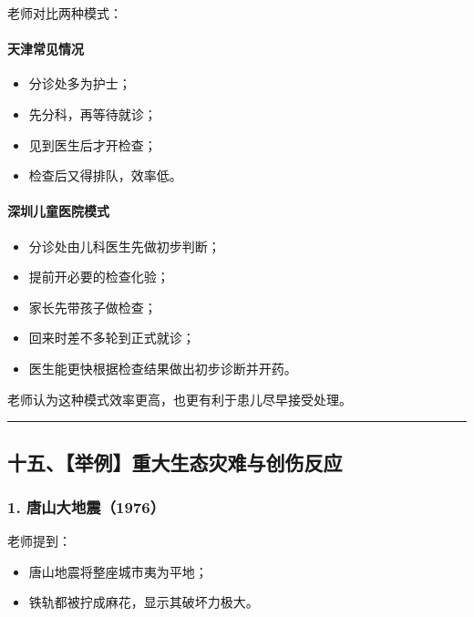 \documentclass[
  chinese,
  9pt,
  a4paper,
]{ctexart}
\providecommand{\tightlist}{%
  \setlength{\itemsep}{0pt}\setlength{\parskip}{0pt}}
\begin{document}
老师对比两种模式：

\paragraph{天津常见情况}\label{ux5929ux6d25ux5e38ux89c1ux60c5ux51b5}

\begin{itemize}
\tightlist
\item
  分诊处多为护士；
\item
  先分科，再等待就诊；
\item
  见到医生后才开检查；
\item
  检查后又得排队，效率低。
\end{itemize}

\paragraph{深圳儿童医院模式}\label{ux6df1ux5733ux513fux7ae5ux533bux9662ux6a21ux5f0f}

\begin{itemize}
\tightlist
\item
  分诊处由儿科医生先做初步判断；
\item
  提前开必要的检查化验；
\item
  家长先带孩子做检查；
\item
  回来时差不多轮到正式就诊；
\item
  医生能更快根据检查结果做出初步诊断并开药。
\end{itemize}

老师认为这种模式效率更高，也更有利于患儿尽早接受处理。

\begin{center}\rule{0.5\linewidth}{0.5pt}\end{center}

\subsection{十五、【举例】重大生态灾难与创伤反应}\label{ux5341ux4e94ux4e3eux4f8bux91cdux5927ux751fux6001ux707eux96beux4e0eux521bux4f24ux53cdux5e94}

\subsubsection{1.
唐山大地震（1976）}\label{ux5510ux5c71ux5927ux5730ux97071976}

老师提到：

\begin{itemize}
\tightlist
\item
  唐山地震将整座城市夷为平地；
\item
  铁轨都被拧成麻花，显示其破坏力极大。
\end{itemize}
\end{document}
